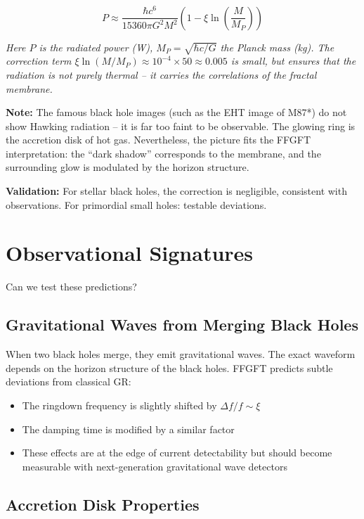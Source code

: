 \begin{equation}
	P \approx \frac{\hbar c^6}{15360 \pi G^2 M^2} \left(1 - \xi \ln\left(\frac{M}{M_P}\right)\right)
\end{equation}

\textit{Here \(P\) is the radiated power (W), \(M_P = \sqrt{\hbar c/G}\) the Planck mass (kg). The correction term \(\xi \ln(M/M_P) \approx 10^{-4} \times 50 \approx 0.005\) is small, but ensures that the radiation is not purely thermal -- it carries the correlations of the fractal membrane.}

\textbf{Note:} The famous black hole images (such as the EHT image of M87*) do not show Hawking radiation -- it is far too faint to be observable. The glowing ring is the accretion disk of hot gas. Nevertheless, the picture fits the FFGFT interpretation: the ``dark shadow'' corresponds to the membrane, and the surrounding glow is modulated by the horizon structure.

\textbf{Validation:} For stellar black holes, the correction is negligible, consistent with observations. For primordial small holes: testable deviations.

\section{Observational Signatures}

Can we test these predictions?

\subsection{Gravitational Waves from Merging Black Holes}

When two black holes merge, they emit gravitational waves. The exact waveform depends on the horizon structure of the black holes. FFGFT predicts subtle deviations from classical GR:

\begin{itemize}[leftmargin=*]
\item The ringdown frequency is slightly shifted by $\Delta f / f \sim \xi$
\item The damping time is modified by a similar factor
\item These effects are at the edge of current detectability but should become measurable with next-generation gravitational wave detectors
\end{itemize}

\subsection{Accretion Disk Properties}

